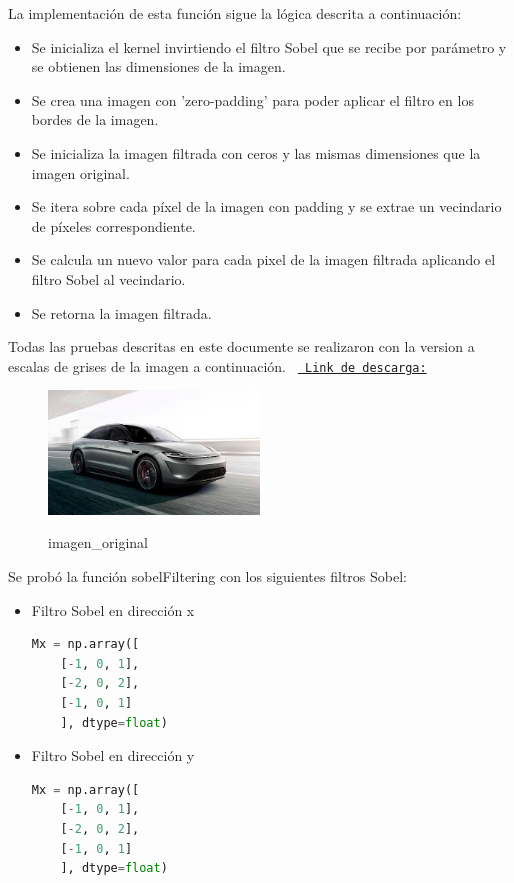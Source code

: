 \documentclass{article}
\begin{document}
    \noindent
    La implementación de esta función sigue la lógica descrita a continuación:
    \begin{itemize}
        \item Se inicializa el kernel invirtiendo el filtro Sobel que se recibe por parámetro y se obtienen las dimensiones de la imagen.
        \item Se crea una imagen con 'zero-padding' para poder aplicar el filtro en los bordes de la imagen.
        \item Se inicializa la imagen filtrada con ceros y las mismas dimensiones que la imagen original.
        \item Se itera sobre cada píxel de la imagen con padding y se extrae un vecindario de píxeles correspondiente.
        \item Se calcula un nuevo valor para cada pixel de la imagen filtrada aplicando el filtro Sobel al vecindario.
        \item Se retorna la imagen filtrada.
    \end{itemize}
    
    \noindent
    Todas las pruebas descritas en este documente se realizaron con la version a escalas de grises de la imagen a continuación.
    \texttt{%
        \href{https://drive.google.com/uc?id=1Vjzotd2ggul9GuD0adkf5KHCen6vQupK&authuser=0}{%
            Link de descarga:}%
    }
    \begin{figure}[!ht]
        \centering
        \caption{imagen\_original}
        \includegraphics[width=0.5\textwidth]{img/carro}\label{fig:1}
    \end{figure}
    
    \noindent
    Se probó la función sobelFiltering con los siguientes filtros Sobel:
    \begin{itemize}
        \item Filtro Sobel en dirección x
        \begin{lstlisting}[language=Python, caption={Filtro Sobel vertical},label={lst:sobelFiltersx}]
    Mx = np.array([
    [-1, 0, 1],
    [-2, 0, 2],
    [-1, 0, 1]
    ], dtype=float)
        \end{lstlisting}
        \item Filtro Sobel en dirección y
        \begin{lstlisting}[language=Python, caption={Filtros Sobel horizontal},label={lst:sobelFiltersy}]
    Mx = np.array([
    [-1, 0, 1],
    [-2, 0, 2],
    [-1, 0, 1]
    ], dtype=float)
        \end{lstlisting}
    \end{itemize}
    
\end{document}

